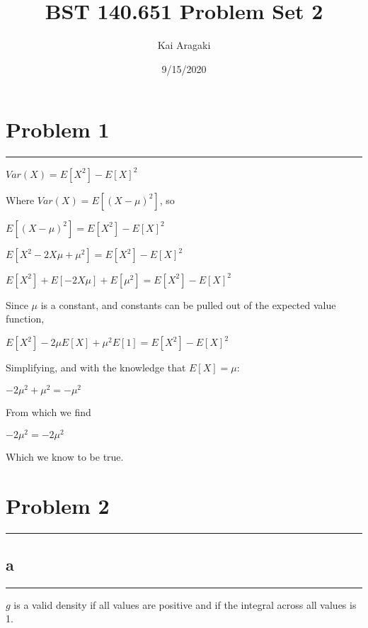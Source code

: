 \documentclass[]{tufte-handout}
\title{BST 140.651 Problem Set 2}
\author{Kai Aragaki}
\date{9/15/2020}
\begin{document}
\maketitle




\hypertarget{problem-1}{%
\section{Problem 1}\label{problem-1}}

\begin{center}\rule{0.5\linewidth}{0.5pt}\end{center}

\(Var(X) = E[X^2]-E[X]^2\)

Where \(Var(X) = E[(X-\mu)^2]\), so

\(E[(X-\mu)^2] = E[X^2]-E[X]^2\)

\(E[X^2-2X\mu + \mu^2] = E[X^2]-E[X]^2\)

\(E[X^2] + E[-2X\mu] + E[\mu^2] = E[X^2]-E[X]^2\)

Since \(\mu\) is a constant, and constants can be pulled out of the
expected value function,

\(E[X^2] -2\mu E[X] + \mu^2 E[1] = E[X^2] -E[X]^2\)

Simplifying, and with the knowledge that \(E[X] = \mu\):

\(-2\mu^2 + \mu^2 = -\mu^2\)

From which we find

\(-2\mu^2 = -2\mu^2\)

Which we know to be true.

\hypertarget{problem-2}{%
\section{Problem 2}\label{problem-2}}

\begin{center}\rule{0.5\linewidth}{0.5pt}\end{center}

\hypertarget{a}{%
\subsection{a}\label{a}}

\begin{center}\rule{0.5\linewidth}{0.5pt}\end{center}

\(g\) is a valid density if all values are positive and if the integral
across all values is 1.
\end{document}
